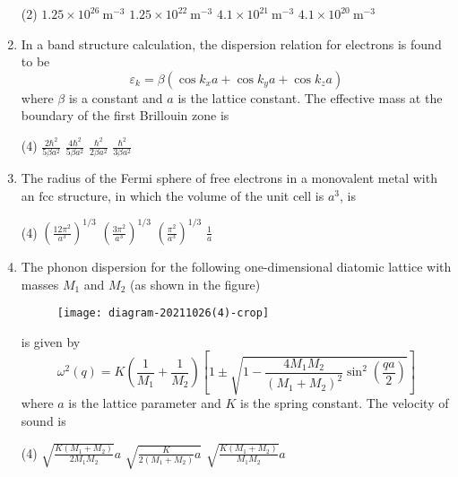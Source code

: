 \begin{enumerate}
	{}
\begin{tasks}(2)
\task[\textbf{A.}] $1.25 \times 10^{26} \mathrm{~m}^{-3}$
\task[\textbf{B.}] $1.25 \times 10^{22} \mathrm{~m}^{-3}$
\task[\textbf{C.}] $4.1 \times 10^{21} \mathrm{~m}^{-3}$
\task[\textbf{D.}] $4.1 \times 10^{20} \mathrm{~m}^{-3}$
\end{tasks}
	\item In a band structure calculation, the dispersion relation for electrons is found to be
	$$
	\varepsilon_{k}=\beta\left(\cos k_{x} a+\cos k_{y} a+\cos k_{z} a\right)
	$$
	where $\beta$ is a constant and $a$ is the lattice constant. The effective mass at the boundary of the first Brillouin zone is
	{}
\begin{tasks}(4)
\task[\textbf{A.}] $\frac{2 \hbar^{2}}{5 \beta a^{2}}$
\task[\textbf{B.}] $\frac{4 \hbar^{2}}{5 \beta a^{2}}$
\task[\textbf{C.}] $\frac{\hbar^{2}}{2 \beta a^{2}}$
\task[\textbf{D.}] $\frac{\hbar^{2}}{3 \beta a^{2}}$
\end{tasks}
	\item The radius of the Fermi sphere of free electrons in a monovalent metal with an $\mathrm{fcc}$ structure, in which the volume of the unit cell is $a^{3}$, is
	{}
\begin{tasks}(4)
\task[\textbf{A.}] $\left(\frac{12 \pi^{2}}{a^{3}}\right)^{1 / 3}$
\task[\textbf{B.}] $\left(\frac{3 \pi^{2}}{a^{3}}\right)^{1 / 3}$
\task[\textbf{C.}] $\left(\frac{\pi^{2}}{a^{3}}\right)^{1 / 3}$
\task[\textbf{D.}] $\frac{1}{a}$
\end{tasks}
	\item The phonon dispersion for the following one-dimensional diatomic lattice with masses $M_{1}$ and $M_{2}$ (as shown in the figure)\\
	\begin{figure}[H]
		\centering
		\texttt{[image: diagram-20211026(4)-crop]}
	\end{figure}
	is given by
	$$
	\omega^{2}(q)=K\left(\frac{1}{M_{1}}+\frac{1}{M_{2}}\right)\left[1 \pm \sqrt{1-\frac{4 M_{1} M_{2}}{\left(M_{1}+M_{2}\right)^{2}} \sin ^{2}\left(\frac{q a}{2}\right)}\right]
	$$
	where $a$ is the lattice parameter and $K$ is the spring constant. The velocity of sound is
	{}
\begin{tasks}(4)
\task[\textbf{A.}] $\sqrt{\frac{K\left(M_{1}+M_{2}\right)}{2 M_{1} M_{2}}} a$
\task[\textbf{B.}] $\sqrt{\frac{K}{2\left(M_{1}+M_{2}\right)} a}$
\task[\textbf{C.}] $\sqrt{\frac{K\left(M_{1}+M_{2}\right)}{M_{1} M_{2}}} a$

\end{tasks}
\end{enumerate}
